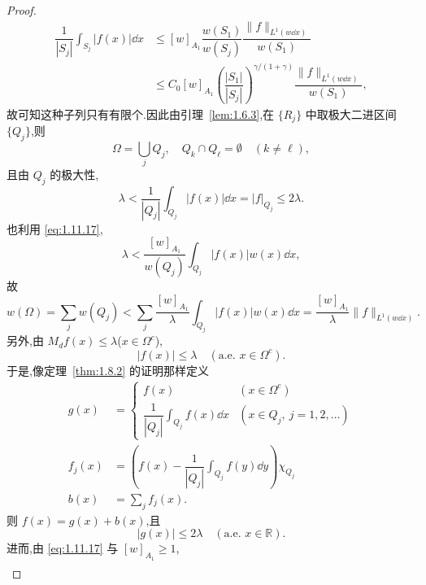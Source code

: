 \begin{proof}
\begin{align*}
\dfrac{1}{|S_{j}|}\displaystyle\int_{S_{j}}|f(x)|\dd x & \leq [w]_{A_{1}}\dfrac{w(S_{1})}{w(S_{j})}\dfrac{\| f \|_{L^{1}(w\dd x)}}{w(S_{1})} \\
& \leq C_{0}[w]_{A_{1}}\left(\dfrac{|S_{1}|}{|S_{j}|}\right)^{\gamma/(1+\gamma)}\dfrac{\| f \|_{L^{1}(w\dd x)}}{w(S_{1})},
\end{align*}
故可知这种子列只有有限个.因此由引理~\ref{lem:1.6.3},在 $\{R_{j}\}$ 中取极大二进区间 $\{Q_{j}\}$,则
\begin{equation*}
\Omega = \bigcup_{j}Q_{j}, \quad Q_{k} \cap Q_{\ell} = \emptyset \quad (k \neq \ell),
\end{equation*}
且由 $Q_{j}$ 的极大性,
\begin{equation*}
\lambda < \frac{1}{|Q_{j}|}\int_{Q_{j}}|f(x)|\dd x = |f|_{Q_{j}} \leq 2\lambda.
\end{equation*}
也利用 \eqref{eq:1.11.17},
\begin{equation*}
\lambda < \frac{[w]_{A_{1}}}{w(Q_{j})}\int_{Q_{j}}|f(x)|w(x)\dd x,
\end{equation*}
故
\begin{equation}\tag{1.11.19}
w(\Omega) = \sum_{j}w(Q_{j}) < \sum_{j}\frac{[w]_{A_{1}}}{\lambda}\int_{Q_{j}}|f(x)|w(x)\dd x = \frac{[w]_{A_{1}}}{\lambda}\| f \|_{L^{1}(w\dd x)}.
\label{eq:1.11.19}\end{equation}
另外,由 $M_{d}f(x) \leq \lambda$($x \in \Omega^{c}$),
\begin{equation*}
|f(x)| \leq \lambda \quad (\text{a.e. } x \in \Omega^{c}).
\end{equation*}
于是,像定理~\ref{thm:1.8.2} 的证明那样定义
\begin{align*}
g(x) &= \begin{cases} f(x) & (x \in \Omega^{c}) \\ \dfrac{1}{|Q_{j}|}\displaystyle\int_{Q_{j}}f(x)\dd x & (x \in Q_{j},\ j = 1, 2, \dots) \end{cases} \\[10pt]
f_{j}(x) &= \left(f(x) - \dfrac{1}{|Q_{j}|}\displaystyle\int_{Q_{j}}f(y)\dd y\right)\chi_{Q_{j}} \\[8pt]
b(x) &= \displaystyle\sum_{j}f_{j}(x).
\end{align*}
则 $f(x) = g(x) + b(x)$,且
\begin{equation*}
|g(x)| \leq 2\lambda \quad (\text{a.e. } x \in \mathbb{R}).
\end{equation*}
进而,由 \eqref{eq:1.11.17} 与 $[w]_{A_{1}} \geq 1$,
\begin{align*}

\end{align*}
\end{proof}
